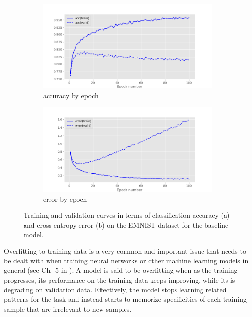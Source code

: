 \documentclass{article}
\begin{document}
\begin{figure}[t]
    \centering
    \begin{subfigure}{\linewidth}
        \includegraphics[width=\linewidth]{figures/fig1_acc.png}
        \caption{accuracy by epoch}
        \label{fig:example_acccurves}
    \end{subfigure} 
    \begin{subfigure}{\linewidth}
        \centering
        \includegraphics[width=\linewidth]{figures/fig1_err.png}
        \caption{error by epoch}
        \label{fig:example_errorcurves}
    \end{subfigure} 
    \caption{Training and validation curves in terms of classification accuracy (a) and cross-entropy error (b) on the EMNIST dataset for the baseline model.}
    \label{fig:example}
\end{figure} 

Overfitting to training data is a very common and important issue that needs to be dealt with when training neural networks or other machine learning models in general (see Ch.~5 in \citealt{Goodfellow-et-al-2016}).
A model is said to be overfitting when as the training progresses, its performance on the training data keeps improving, while its is degrading on validation data. 
Effectively, the model stops learning related patterns for the task and instead starts to memorize specificities of each training sample that are irrelevant to new samples.
\end{document}
